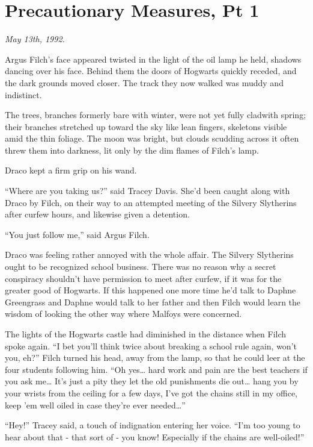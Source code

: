 \chapter{Precautionary Measures, Pt 1}

\emph{May 13th, 1992.}

Argus Filch's face appeared twisted in the light of the oil lamp he held, shadows dancing over his face. Behind them the doors of Hogwarts quickly receded, and the dark grounds moved closer. The track they now walked was muddy and indistinct.

The trees, branches formerly bare with winter, were not yet fully cladwith spring; their branches stretched up toward the sky like lean fingers, skeletons visible amid the thin foliage. The moon was bright, but clouds scudding across it often threw them into darkness, lit only by the dim flames of Filch's lamp.

Draco kept a firm grip on his wand.

``Where are you taking us?'' said Tracey Davis. She'd been caught along with Draco by Filch, on their way to an attempted meeting of the Silvery Slytherins after curfew hours, and likewise given a detention.

``You just follow me,'' said Argus Filch.

Draco was feeling rather annoyed with the whole affair. The Silvery Slytherins ought to be recognized school business. There was no reason why a secret conspiracy shouldn't have permission to meet after curfew, if it was for the greater good of Hogwarts. If this happened one more time he'd talk to Daphne Greengrass and Daphne would talk to her father and then Filch would learn the wisdom of looking the other way where Malfoys were concerned.

The lights of the Hogwarts castle had diminished in the distance when Filch spoke again. ``I bet you'll think twice about breaking a school rule again, won't you, eh?'' Filch turned his head, away from the lamp, so that he could leer at the four students following him. ``Oh yes\ldots{} hard work and pain are the best teachers if you ask me\ldots{} It's just a pity they let the old punishments die out\ldots{} hang you by your wrists from the ceiling for a few days, I've got the chains still in my office, keep 'em well oiled in case they're ever needed\ldots{}''

``Hey!'' Tracey said, a touch of indignation entering her voice. ``I'm too young to hear about that - that sort of - you know! Especially if the chains are well-oiled!''

